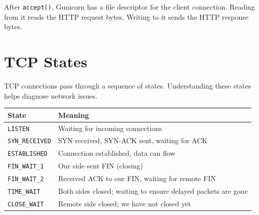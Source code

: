 \noindent{}After \texttt{accept()}, Gunicorn has a file descriptor for the client connection. Reading from it reads the HTTP request bytes. Writing to it sends the HTTP response bytes.

\setcounter{section}{3}
\section{TCP States}\label{26-network-stack-flow:264-tcp-states}

TCP connections pass through a sequence of states. Understanding these states helps diagnose network issues.

\begin{codebox}[short]

\begin{Shaded}
\begin{Highlighting}[]
 
\end{Highlighting}
\end{Shaded}

\end{codebox}


{\def\LTcaptype{none} %
\begin{longtable}[]{@{}
  >{\raggedright\arraybackslash}p{}
  >{\raggedright\arraybackslash}p{}@{}}
\toprule\noalign{}
\begin{minipage}[b]{\linewidth}\raggedright
State
\end{minipage} & \begin{minipage}[b]{\linewidth}\raggedright
Meaning
\end{minipage} \\
\midrule\noalign{}
\endhead
\bottomrule\noalign{}
\endlastfoot
\texttt{LISTEN} & Waiting for incoming connections \\
\texttt{SYN\_RECEIVED} & SYN received, SYN-ACK sent, waiting for ACK \\
\texttt{ESTABLISHED} & Connection established, data can flow \\
\texttt{FIN\_WAIT\_1} & Our side sent FIN (closing) \\
\texttt{FIN\_WAIT\_2} & Received ACK to our FIN, waiting for remote FIN \\
\texttt{TIME\_WAIT} & Both sides closed; waiting to ensure delayed packets are gone \\
\texttt{CLOSE\_WAIT} & Remote side closed; we have not closed yet \\
\end{longtable}
}

